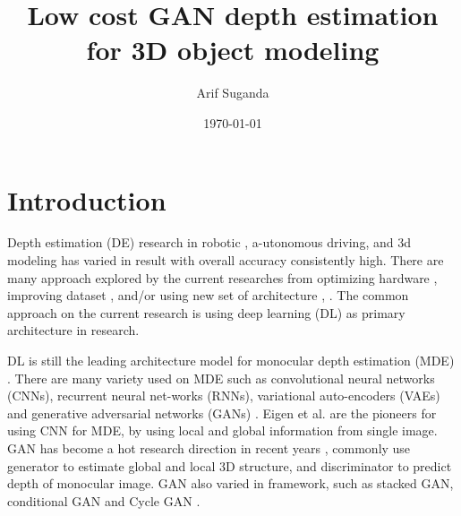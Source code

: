 \documentclass[a4paper,12pt]{article}
\title{Low cost GAN depth estimation for 3D object modeling}
\author{Arif Suganda}
\date{\today}
\begin{document}


\section{Introduction}
Depth estimation (DE) research in robotic \cite{chang9010976}, a-utonomous driving, and 3d modeling has varied in result with overall accuracy consistently high.
There are many approach explored by the current researches from optimizing hardware \cite{chang9010976}, improving dataset \cite{guizilini9156708}, and/or using new set of architecture \cite{guizilini9156708}, \cite{hendra10113647}.
The common approach on the current research is using deep learning (DL) as primary architecture in research.

DL is still the leading architecture model for monocular depth estimation (MDE) \cite{masomians22145353}.
There are many variety used on MDE such as convolutional neural networks (CNNs), recurrent neural net-works (RNNs), 
variational auto-encoders (VAEs) and generative adversarial networks (GANs) \cite{zhao101007}.
Eigen et al. \cite{eigen14062283} are the pioneers for using CNN for MDE, by using local and global information from single image.
GAN has become a hot research direction in recent years \cite{zhao101007}, commonly use generator to estimate global and local 3D structure, 
and discriminator to predict depth of monocular image. GAN also varied in framework, such as stacked GAN, conditional GAN \cite{hendra10113647} and Cycle GAN \cite{zhao101007}.
\end{document}

